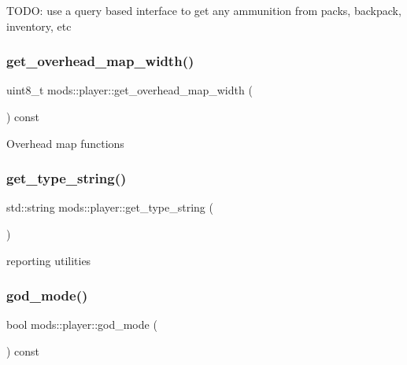 T\+O\+DO\+: use a query based interface to get any ammunition from packs, backpack, inventory, etc \mbox{\label{classmods_1_1player_a05b78e56ec3b207c2ebd5396b4e3bd65}} 
\subsubsection{\texorpdfstring{get\+\_\+overhead\+\_\+map\+\_\+width()}{get\_overhead\_map\_width()}}
{\footnotesize\ttfamily uint8\+\_\+t mods\+::player\+::get\+\_\+overhead\+\_\+map\+\_\+width (\begin{DoxyParamCaption}{ }\end{DoxyParamCaption}) const\hspace{0.3cm}{\ttfamily [inline]}}

Overhead map functions \mbox{\label{classmods_1_1player_ab0139ef41b09f35cf6212763e9ff4584}} 
\subsubsection{\texorpdfstring{get\+\_\+type\+\_\+string()}{get\_type\_string()}}
{\footnotesize\ttfamily std\+::string mods\+::player\+::get\+\_\+type\+\_\+string (\begin{DoxyParamCaption}{ }\end{DoxyParamCaption})}

reporting utilities \mbox{\label{classmods_1_1player_a2ce826104a9d3a2c853ee6d4e02fe689}} 
\subsubsection{\texorpdfstring{god\+\_\+mode()}{god\_mode()}}
{\footnotesize\ttfamily bool mods\+::player\+::god\+\_\+mode (\begin{DoxyParamCaption}{ }\end{DoxyParamCaption}) const}

